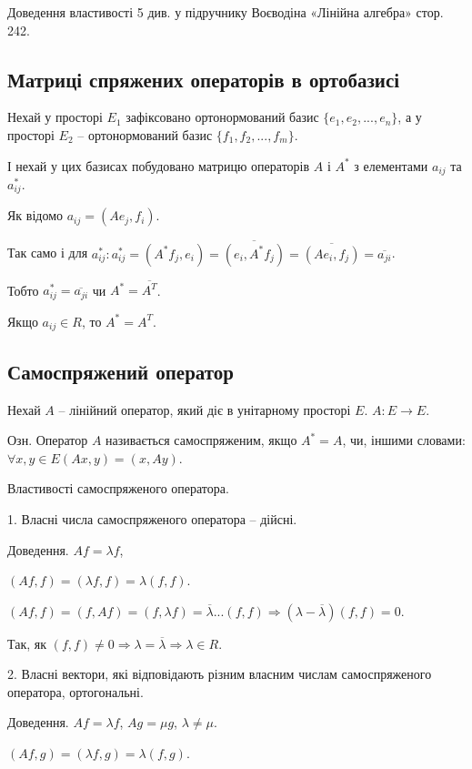Доведення властивості 5 див. у підручнику Воєводіна «Лінійна алгебра»
стор. 242.

\subsection*{Матриці спряжених операторів в ортобазисі}

Нехай у просторі $E_1$ зафіксовано ортонормований базис $\{e_1, e_2, ..., e_n\}$, а у
просторі $E_2$ -- ортонормований базис $\{f_1, f_2, ..., f_m\}$.

І нехай у цих базисах побудовано матрицю операторів $A$ і $A^*$ з елементами
$a_{ij}$ та $a^*_{ij}$.

Як відомо $a_{ij} = (Ae_j, f_i)$.

Так само і для $a_{ij}^*: a_{ij}^* = (A^* f_j, e_i) = \overline{(e_i, A^* f_j)}
= \overline{(A e_i, f_j)} = \overline{a_{ji}}$.

Тобто $a_{ij}^* = \overline{a_{ji}}$ чи $A^* = \overline{A^T}$.

Якщо $a_{ij} \in R$, то $A^* = A^T$.

\subsection*{Самоспряжений оператор}

Нехай $A$ -- лінійний оператор, який діє в унітарному просторі $E$.
$A: E \rightarrow E$.

Озн. Оператор $A$ називається самоспряженим, якщо $A^* = A$, чи, іншими
словами: $\forall x, y \in E (Ax, y) = (x, A y)$.

Властивості самоспряженого оператора.

1. Власні числа самоспряженого оператора -- дійсні.

Доведення.
$Af = \lambda f$,

$(A f, f) = (\lambda f, f) = \lambda (f, f)$.

$(A f, f) = (f, A f) = (f, \lambda f) = \overline{\lambda}...(f,f) \Rightarrow (\lambda - \overline{\lambda})(f,f) = 0$.

Так, як $(f,f) \neq 0 \Rightarrow \lambda = \overline{\lambda} \Rightarrow \lambda \in R$.

2. Власні вектори, які відповідають різним власним числам самоспряженого
оператора, ортогональні.

Доведення.
$A f = \lambda f$, $A g = \mu g$, $\lambda \neq \mu$.

$(Af, g) = (\lambda f, g) = \lambda(f,g)$.

